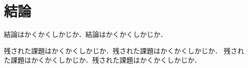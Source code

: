 \chapter{結論}

結論はかくかくしかじか．結論はかくかくしかじか．

残された課題はかくかくしかじか．残された課題はかくかくしかじか．
残された課題はかくかくしかじか．残された課題はかくかくしかじか．
